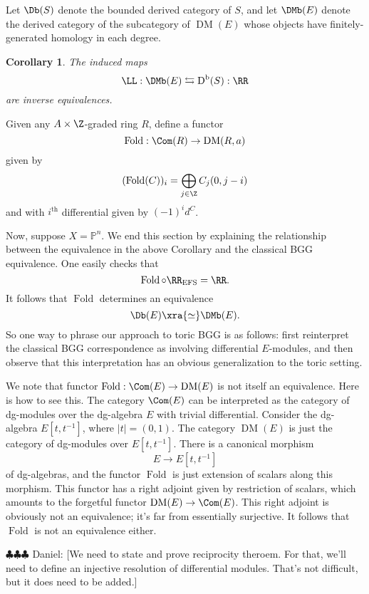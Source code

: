 \documentclass[12pt]{amsart}
\newtheorem{cor}[lemma]{Corollary}
\theoremstyle{definition}
\theoremstyle{remark}
\newcommand{\PP}{\mathbb P}
\newcommand{\daniel}[1]{{\color{blue} \sf $\clubsuit\clubsuit\clubsuit$ Daniel: [#1]}}
\def\on{\operatorname}
\def\DM{\operatorname{DM}}
\def\th{\on{th}}
\begin{document}
Let $\Db(S)$ denote the bounded derived category of $S$, and let $\DMb(E)$ denote the derived category of the subcategory of $\DM(E)$ whose objects have finitely-generated homology in each degree. 




\begin{cor}
The induced maps 
$$
\LL : \DMb(E)  \leftrightarrows \on{D}^{\on{b}}(S) : \RR
$$
are inverse equivalences.
\end{cor}

Given any $A \times \Z$-graded ring $R$, define a functor
$$
\on{Fold} : \Com(R) \to \DM(R, a)
$$
given by
$$
(\on{Fold}(C))_i = \bigoplus_{j \in \Z} C_j(0, j-i)
$$
and with $i^{\th}$ differential given by $(-1)^id^C$. 


Now, suppose $X = \PP^n$. We end this section by explaining the relationship between the equivalence in the above Corollary and the classical BGG equivalence. One easily checks that
$$
\on{Fold} \circ \RR_{\on{EFS}} = \RR.
$$
It follows that $\on{Fold}$ determines an equivalence
$$
\Db(E) \xra{\simeq} \DMb(E).
$$
So one way to phrase our approach to toric BGG is as follows: first reinterpret the classical BGG correspondence as involving differential $E$-modules, and then observe that this interpretation has an obvious generalization to the toric setting.

We note that functor $\on{Fold} : \Com(E) \to \DM(E)$ is not itself an equivalence. Here is how to see this. The category $\Com(E)$ can be interpreted as the category of dg-modules over the dg-algebra $E$ with trivial differential. Consider the dg-algebra $E[t, t^{-1}]$, where $|t| = (0, 1)$. The category $\DM(E)$ is just the category of dg-modules over $E[t, t^{-1}]$. There is a canonical morphism 
$$
E \to E[t, t^{-1}]
$$ 
of dg-algebras, and the functor $\on{Fold}$ is just extension of scalars along this morphism. This functor has a right adjoint given by restriction of scalars, which amounts to the forgetful functor $\DM(E) \to \Com(E)$. This right adjoint is obviously not an equivalence; it's far from essentially surjective. It follows that $\on{Fold}$ is not an equivalence either. 

\daniel{We need to state and prove reciprocity theroem.  For that, we'll need to define an injective resolution of differential modules.  That's not difficult, but it does need to be added.}
\end{document}
